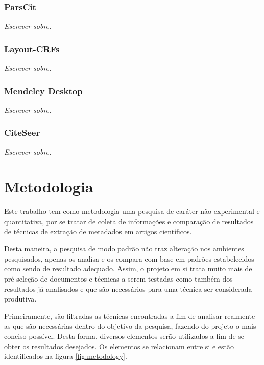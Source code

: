 \documentclass[
	12pt,               %
	openright,          %
	twoside,            %
	a4paper,            %
	english,            %
	brazil              %
	]{abntex2}
\begin{document}
\subsection{ParsCit}

\textit{Escrever sobre.}

\subsection{Layout-CRFs}

\textit{Escrever sobre.}

\subsection{Mendeley Desktop}

\textit{Escrever sobre.}

\subsection{CiteSeer}

\textit{Escrever sobre.}



	

	 

\chapter{Metodologia}

Este trabalho tem como metodologia uma pesquisa de caráter não-experimental e quantitativa, por se tratar de coleta de informações e comparação de resultados de técnicas de extração de metadados em artigos científicos.

Desta maneira, a pesquisa de modo padrão não traz alteração nos ambientes pesquisados, apenas os analisa e os compara com base em padrões estabelecidos como sendo de resultado adequado. Assim, o projeto em si trata muito mais de pré-seleção de documentos e técnicas a serem testadas como também dos resultados já analisados e que são necessários para uma técnica ser considerada produtiva.


Primeiramente, são filtradas as técnicas encontradas a fim de analisar realmente as que são necessárias dentro do objetivo da pesquisa, fazendo do projeto o mais conciso possível. Desta forma, diversos elementos serão utilizados a fim de se obter os resultados desejados. Os elementos se relacionam entre si e estão identificados na figura \ref{fig:metodology}. 
\end{document}
